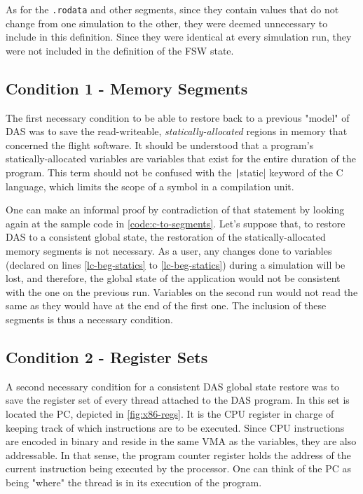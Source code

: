 {As for the \texttt{.rodata} and other segments, since they contain values that do not change from one simulation to the other, they were deemed unnecessary to include in this definition. Since they were identical at every simulation run, they were not included in the definition of the FSW state.

\subsection*{Condition 1 - Memory Segments}
The first necessary condition to be able to restore back to a previous "model" of DAS was to save the read-writeable, \textit{statically-allocated} regions in memory that concerned the flight software. It should be understood that a program's statically-allocated variables are variables that exist for the entire duration of the program. This term should not be confused with the \texttt|static| keyword of the C language, which limits the scope of a symbol in a compilation unit.

One can make an informal proof by contradiction of that statement by looking again at the sample code in \autoref{code:c-to-segments}. Let's suppose that, to restore DAS to a consistent global state, the restoration of the statically-allocated memory segments is not necessary. As a user, any changes done to variables (declared on lines \ref{lc-beg-statics} to \ref{lc-beg-statics}) during a simulation will be lost, and therefore, the global state of the application would not be consistent with the one on the previous run. Variables on the second run would not read the same as they would have at the end of the first one. The inclusion of these segments is thus a necessary condition.

\subsection*{Condition 2 - Register Sets}
A second necessary condition for a consistent DAS global state restore was to save the register set of every thread attached to the DAS program. In this set is located the \gls{PC}, depicted in \autoref{fig:x86-regs}. It is the CPU register in charge of keeping track of which instructions are to be executed. Since CPU instructions are encoded in binary and reside in the same \gls{VMA} as the variables, they are also addressable. In that sense, the program counter register holds the address of the current instruction being executed by the processor. One can think of the PC as being "where" the thread is in its execution of the program.

}
